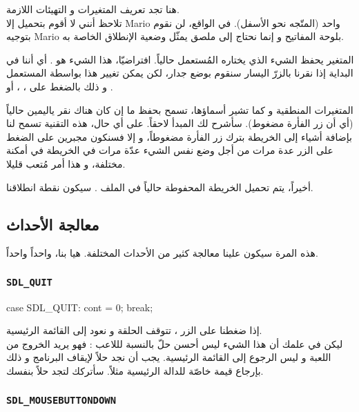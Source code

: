 هنا تجد تعريف المتغيرات و التهيئات اللازمة.\\
تلاحظ أنني لا أقوم بتحميل إلا 
\textenglish{Mario}
واحد (المتّجه نحو الأسفل). في الواقع، لن نقوم بتوجيه
\textenglish{Mario}
بلوحة المفاتيح و إنما نحتاج إلى ملصق يمثّل وضعية الإنطلاق الخاصة به.

المتغير
يحفظ الشيء الذي يختاره المُستعمل حالياً. افتراضيّا، هذا الشيء هو
.
 أي أننا في البداية إذا نقرنا بالزرّ اليسار سنقوم بوضع جدار، لكن يمكن تغيير هذا بواسطة المستعمل و ذلك بالضغط على 
، ، 
 أو
.

المتغيرات المنطقية
و
كما تشير أسماؤها، تسمح بحفظ ما إن كان هناك نقر ياليمين حالياً (أي أن زر الفأرة مضغوط). سأشرح لك المبدأ لاحقاً. على أي حال، هذه التقنية تسمح لنا بإضافة أشياء إلى الخريطة بترك زر الفأرة مضغوطاً، و إلا فسنكون مجبرين على الضغط على الزر عدة مرات من أجل وضع نفس الشيء عدّة مرات في الخريطة في أمكنة مختلفة، و هذا أمر مُتعب قليلا.

أخيراً، يتم تحميل الخريطة المحفوطة حالياً في الملف
.
سيكون نقطة انطلاقنا.

\subsection{معالجة الأحداث}

هذه المرة سيكون علينا معالجة كثير من الأحداث المختلفة. هيا بنا، واحداً واحداً.

\subsubsection{\texttt{SDL\_QUIT}}

\begin{Csource}
case SDL_QUIT:
cont = 0;
break;
\end{Csource}

إذا ضغطنا على الزر
،
تتوقف الحلقة و نعود إلى القائمة الرئيسية.\\
ليكن في علمك أن هذا الشيء ليس أحسن حلّ بالنسبة لللاعب : فهو يريد الخروج من اللعبة و ليس الرجوع إلى القائمة الرئيسية. يجب أن نجد حلاً لإيقاف البرنامج و ذلك بإرجاع قيمة خاصّة للدالة الرئيسية مثلاً. سأتركك لتجد حلاً بنفسك.

\subsubsection{\texttt{SDL\_MOUSEBUTTONDOWN}}

